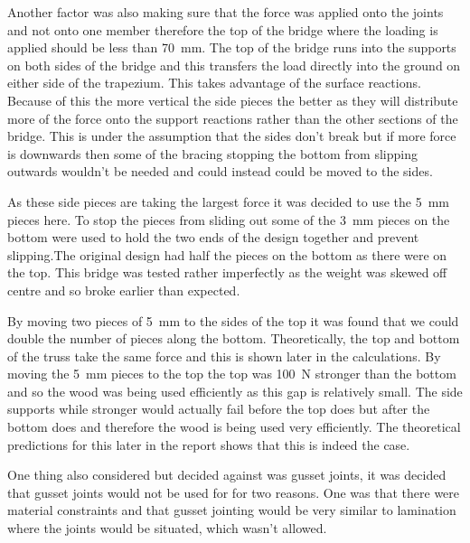 \documentclass[12pt]{article}
\begin{document}
Another factor was also making sure that the force was applied onto the joints and not onto one member therefore the top of the bridge where the loading is applied should be less than 70~mm. The top of the bridge runs into the supports on both sides of the bridge and this transfers the load directly into the ground on either side of the trapezium. This takes advantage of the surface reactions. Because of this the more vertical the side pieces the better as they will distribute more of the force onto the support reactions rather than the other sections of the bridge. This is under the assumption that the sides don't break but if more force is downwards then some of the bracing stopping the bottom from slipping outwards wouldn't be needed and could instead could be moved to the sides.  

As these side pieces are taking the largest force it was decided to use the 5~mm pieces here. To stop the pieces from sliding out some of the 3~mm pieces on the bottom were used to hold the two ends of the design together and prevent slipping.The original design had half the pieces on the bottom as there were on the top. This bridge was tested rather imperfectly as the weight was skewed off centre and so broke earlier than expected. 

By moving two pieces of 5~mm to the sides of the top it was found that we could double the number of pieces along the bottom. Theoretically, the top and bottom of the truss take the same force and this is shown later in the calculations. By moving the 5~mm pieces to the top the top was 100~N stronger than the bottom and so the wood was being used efficiently as this gap is relatively small. The side supports while stronger would actually fail before the top does but after the bottom does and therefore the wood is being used very efficiently. The theoretical predictions for this later in the report shows that this is indeed the case.

One thing also considered but decided against was gusset joints, it was decided that gusset joints would not be used for for two reasons. One was that there were material constraints and that gusset jointing would be very similar to lamination where the joints would be situated, which wasn't allowed.
\end{document}

